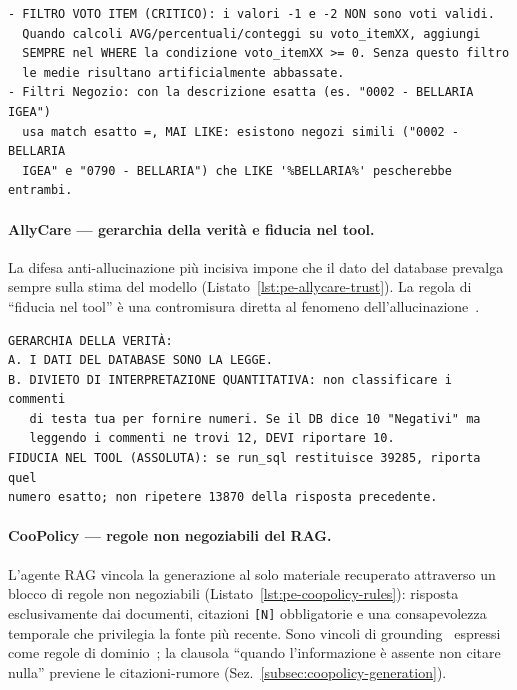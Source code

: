 \begin{lstlisting}[caption={AllyCare: regole SQL di dominio (estratto) --- filtro di validità dei voti e disambiguazione esatto/LIKE.},label={lst:pe-allycare-sql}]
- FILTRO VOTO ITEM (CRITICO): i valori -1 e -2 NON sono voti validi.
  Quando calcoli AVG/percentuali/conteggi su voto_itemXX, aggiungi
  SEMPRE nel WHERE la condizione voto_itemXX >= 0. Senza questo filtro
  le medie risultano artificialmente abbassate.
- Filtri Negozio: con la descrizione esatta (es. "0002 - BELLARIA IGEA")
  usa match esatto =, MAI LIKE: esistono negozi simili ("0002 - BELLARIA
  IGEA" e "0790 - BELLARIA") che LIKE '%BELLARIA%' pescherebbe entrambi.
\end{lstlisting}

\paragraph{AllyCare --- gerarchia della verità e fiducia nel tool.}
La difesa anti-allucinazione più incisiva impone che il dato del
database prevalga sempre sulla stima del modello
(Listato~\ref{lst:pe-allycare-trust}). La regola di ``fiducia nel tool''
è una contromisura diretta al fenomeno
dell'allucinazione~\cite{xu2024hallucination}.

\begin{lstlisting}[caption={AllyCare: gerarchia della verità e ``fiducia nel tool'' (estratto).},label={lst:pe-allycare-trust}]
GERARCHIA DELLA VERITÀ:
A. I DATI DEL DATABASE SONO LA LEGGE.
B. DIVIETO DI INTERPRETAZIONE QUANTITATIVA: non classificare i commenti
   di testa tua per fornire numeri. Se il DB dice 10 "Negativi" ma
   leggendo i commenti ne trovi 12, DEVI riportare 10.
FIDUCIA NEL TOOL (ASSOLUTA): se run_sql restituisce 39285, riporta quel
numero esatto; non ripetere 13870 della risposta precedente.
\end{lstlisting}

\paragraph{CooPolicy --- regole non negoziabili del RAG.}
L'agente RAG vincola la generazione al solo materiale recuperato
attraverso un blocco di regole non negoziabili
(Listato~\ref{lst:pe-coopolicy-rules}): risposta esclusivamente dai
documenti, citazioni \texttt{[N]} obbligatorie e una consapevolezza
temporale che privilegia la fonte più recente. Sono vincoli di
grounding~\cite{lewis2020rag,guu2020realm} espressi come regole di
dominio~\cite{sahoo2024prompteng_survey}; la clausola ``quando
l'informazione è assente non citare nulla'' previene le citazioni-rumore
(Sez.~\ref{subsec:coopolicy-generation}).

